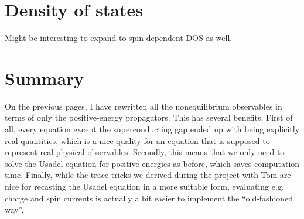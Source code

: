 \clearpage
\section{Density of states}
Might be interesting to expand to spin-dependent DOS as well.

\clearpage
\section{Summary}
On the previous pages, I have rewritten all the nonequilibrium observables in terms of only the positive-energy propagators.
This has several benefits.
First of all, every equation except the superconducting gap ended up with being explicitly real quantities, which is a nice quality for an equation that is supposed to represent real physical observables.
Secondly, this means that we only need to solve the Usadel equation for positive energies as before, which saves computation time.
Finally, while the trace-tricks we derived during the project with Tom are nice for recasting the Usadel equation in a more suitable form, evaluating e.g. charge and spin currents is actually a bit easier to implement the ``old-fashioned way''.
